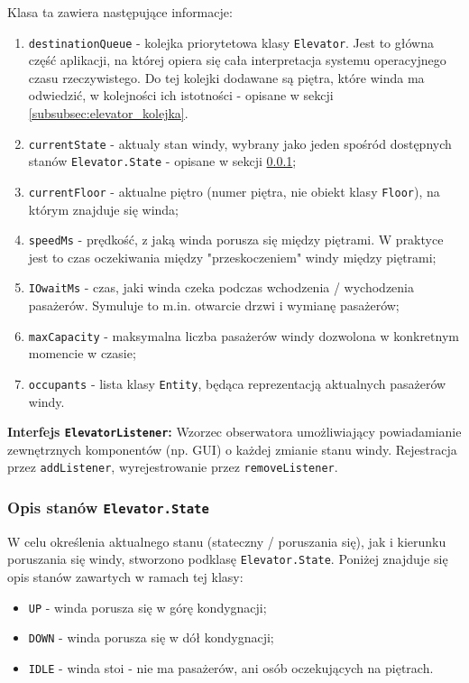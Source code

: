 \documentclass[12pt, a4paper]{article}
\begin{document}
Klasa ta zawiera następujące informacje:
\begin{enumerate}
    \item \texttt{destinationQueue} - kolejka priorytetowa klasy \texttt{Elevator}. Jest to główna część aplikacji, na której opiera się cała interpretacja 
            systemu operacyjnego czasu rzeczywistego. Do tej kolejki dodawane są piętra, które winda ma odwiedzić, w kolejności ich istotności - opisane w sekcji 
            \ref{subsubsec:elevator_kolejka}.
    \item \texttt{currentState} - aktualy stan windy, wybrany jako jeden spośród dostępnych stanów \texttt{Elevator.State} - opisane w sekcji \ref{subsubsec:elevator_stany};
    \item \texttt{currentFloor} - aktualne piętro (numer piętra, nie obiekt klasy \texttt{Floor}), na którym znajduje się winda;  
    \item \texttt{speedMs} - prędkość, z jaką winda porusza się między piętrami. W praktyce jest to czas oczekiwania między "przeskoczeniem" windy między piętrami;
    \item \texttt{IOwaitMs} - czas, jaki winda czeka podczas wchodzenia / wychodzenia pasażerów. Symuluje to m.in. otwarcie drzwi i wymianę pasażerów;
    \item \texttt{maxCapacity} - maksymalna liczba pasażerów windy dozwolona w konkretnym momencie w czasie;
    \item \texttt{occupants} - lista klasy \texttt{Entity}, będąca reprezentacją aktualnych pasażerów windy.
\end{enumerate}

\textbf{Interfejs \texttt{ElevatorListener}:}
Wzorzec obserwatora umożliwiający powiadamianie zewnętrznych komponentów (np. GUI) o każdej zmianie stanu windy. Rejestracja przez \texttt{addListener}, wyrejestrowanie przez \texttt{removeListener}.

\subsubsection{Opis stanów \texttt{Elevator.State}}
\label{subsubsec:elevator_stany}
W celu określenia aktualnego stanu (stateczny / poruszania się), jak i kierunku poruszania się windy, stworzono podklasę \texttt{Elevator.State}. Poniżej znajduje się 
opis stanów zawartych w ramach tej klasy:
\begin{itemize}
  \item \texttt{UP} - winda porusza się w górę kondygnacji;
  \item \texttt{DOWN} - winda porusza się w dół kondygnacji;
  \item \texttt{IDLE} - winda stoi - nie ma pasażerów, ani osób oczekujących na piętrach.
\end{itemize}
\end{document}
